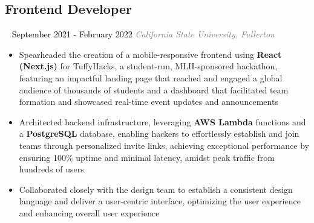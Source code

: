 \documentclass{article}
\newcommand{\resumesection}[3]{
    \subsection*{#1}
    \ 
    \normalsize
    \normalsize
    \hfill
    \textcolor{black}{#3}
    \normalsize
    \newline
    \small
    \textcolor{grey}{\emph{#2}}
}
\begin{document}
\resumesection{Frontend Developer}{California State University, Fullerton}{September 2021 - February 2022}
\begin{itemize}
    \item Spearheaded the creation of a mobile-responsive frontend using \textbf{React (Next.js)} for TuffyHacks, a student-run, MLH-sponsored hackathon, featuring an impactful landing page that reached and engaged a global audience of thousands of students and a dashboard that facilitated team formation and showcased real-time event updates and announcements
    \item Architected backend infrastructure, leveraging \textbf{AWS Lambda} functions and a \textbf{PostgreSQL} database, enabling hackers to effortlessly establish and join teams through personalized invite links, achieving exceptional performance by ensuring 100\% uptime and minimal latency, amidst peak traffic from hundreds of users
    \item Collaborated closely with the design team to establish a consistent design language and deliver a user-centric interface, optimizing the user experience and enhancing overall user experience
\end{itemize}
\end{document}
